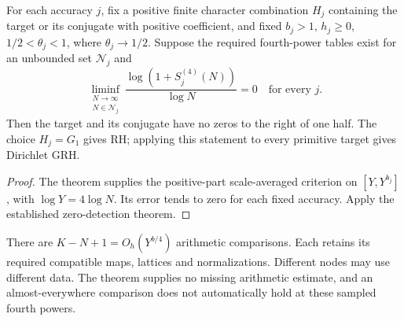 \begin{corollary}\label{shared-fourth-criterion}
For each accuracy $j$, fix a positive finite character combination
$H_j$ containing the target or its conjugate with positive coefficient,
and fixed $b_j>1$, $h_j\ge0$, $1/2<\theta_j<1$, where
$\theta_j\to1/2$. Suppose the required fourth-power tables exist
for an unbounded set $\mathcal N_j$ and
\[
 \liminf_{\substack{N\to\infty\\N\in\mathcal N_j}}
 \frac{\log(1+S_j^{(4)}(N))}{\log N}=0
 \quad\text{for every }j.
\]
Then the target and its conjugate have no zeros to the right of
one half. The choice $H_j=G_1$ gives RH; applying this statement
to every primitive target gives Dirichlet GRH.
\end{corollary}
\begin{proof}
The theorem supplies the positive-part scale-averaged criterion on
$[Y,Y^{b_j}]$, with $\log Y=4\log N$. Its error tends to zero for
each fixed accuracy. Apply the established zero-detection theorem.
\end{proof}

There are $K-N+1=O_h(Y^{b/4})$ arithmetic comparisons. Each retains
its required compatible maps, lattices and normalizations. Different
nodes may use different data. The theorem supplies no missing arithmetic
estimate, and an almost-everywhere comparison does not automatically
hold at these sampled fourth powers.
